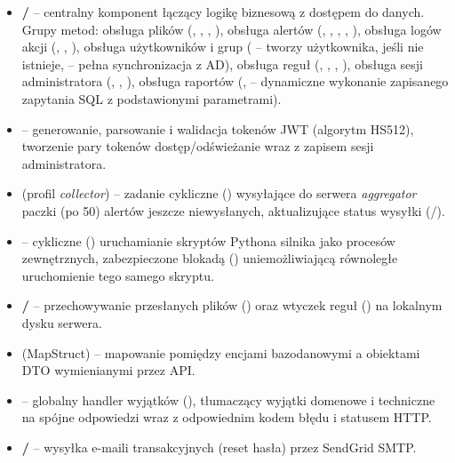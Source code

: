 
\begin{itemize}[leftmargin=1.6em]
  \item \textbf{ / } -- centralny komponent łączący
        logikę biznesową z dostępem do danych. Grupy metod: obsługa plików
        (, , , ),
        obsługa alertów (, , ,
        , ), obsługa logów akcji
        (, , ), obsługa
        użytkowników i grup ( -- tworzy użytkownika, jeśli nie istnieje,
         -- pełna synchronizacja z AD), obsługa reguł
        (, , , ),
        obsługa sesji administratora (, ,
        ), obsługa raportów (, 
        -- dynamiczne wykonanie zapisanego zapytania SQL z podstawionymi parametrami).
  \item \textbf{} -- generowanie, parsowanie i walidacja tokenów JWT (algorytm
        HS512), tworzenie pary tokenów dostęp/odświeżanie wraz z zapisem sesji administratora.
  \item \textbf{} (profil \emph{collector}) -- zadanie cykliczne
        () wysyłające do serwera \emph{aggregator} paczki (po 50) alertów jeszcze
        niewysłanych, aktualizujące status wysyłki (/).
  \item \textbf{} -- cykliczne ()
        uruchamianie skryptów Pythona silnika  jako procesów zewnętrznych,
        zabezpieczone blokadą () uniemożliwiającą równoległe uruchomienie
        tego samego skryptu.
  \item \textbf{ / } -- przechowywanie
        przesłanych plików () oraz wtyczek reguł () na
        lokalnym dysku serwera.
  \item \textbf{} (MapStruct) -- mapowanie pomiędzy encjami bazodanowymi
        a obiektami DTO wymienianymi przez API.
  \item \textbf{} -- globalny handler wyjątków (),
        tłumaczący wyjątki domenowe i techniczne na spójne odpowiedzi  wraz
        z odpowiednim kodem błędu i statusem HTTP.
  \item \textbf{/} -- wysyłka e-maili transakcyjnych
        (reset hasła) przez SendGrid SMTP.
\end{itemize}

